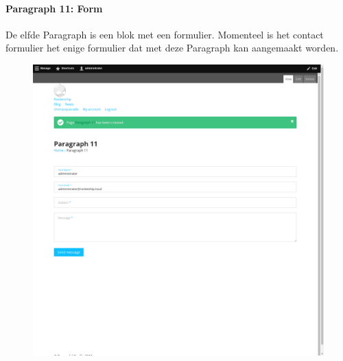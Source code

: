 \paragraph{Paragraph 11: Form}
De elfde Paragraph is een blok met een formulier. Momenteel is het contact formulier het enige formulier dat met deze Paragraph kan aangemaakt worden.
\begin{figure}[h]
\includegraphics[width=1\textwidth]{img/p011.png}
\end{figure}


\clearpage
